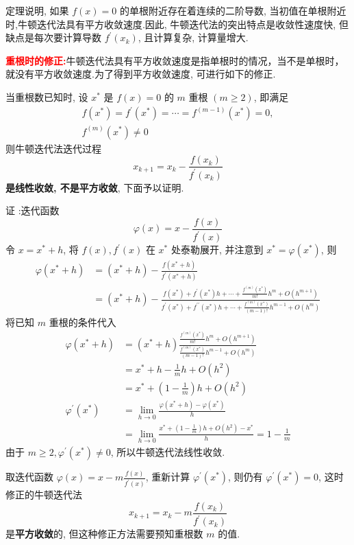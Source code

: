 定理说明, 如果 $ f(x)=0 $ 的单根附近存在着连续的二阶导数, 当初值在单根附近时,牛顿迭代法具有平方收敛速度.因此, 牛顿迭代法的突出特点是收敛性速度快, 但缺点是每次要计算导数 $ f^{\prime}\left(x_{k}\right) $, 且计算复杂, 计算量增大.

 \textbf{\textcolor{red}{重根时的修正:}}牛顿迭代法具有平方收敛速度是指单根时的情况，当不是单根时，就没有平方收敛速度.为了得到平方收敛速度, 可进行如下的修正.

当重根数已知时, 设 $ x^{*} $ 是 $ f(x)=0 $ 的 $ m $ 重根 $ (m \geqslant 2) $, 即满足
$$
\begin{array}{c}
f\left(x^{*}\right)=f^{\prime}\left(x^{*}\right)=\cdots=f^{(m-1)}\left(x^{*}\right)=0, \\
f^{(m)}\left(x^{*}\right) \neq 0
\end{array}
$$
则牛顿迭代法迭代过程
$$\boxed{
x_{k+1}=x_{k}-\frac{f\left(x_{k}\right)}{f^{\prime}\left(x_{k}\right)}}
$$
\textbf{是线性收敛, 不是平方收敛}, 下面予以证明.

证 :迭代函数
$$
\varphi(x)=x-\frac{f(x)}{f^{\prime}(x)}
$$
令 $ x=x^{*}+h $, 将 $ f(x), f^{\prime}(x) $ 在 $ x^{*} $ 处泰勒展开, 并注意到 $ x^{*}=\varphi\left(x^{*}\right) $, 则
$$
\begin{aligned}
\varphi\left(x^{*}+h\right) & =\left(x^{*}+h\right)-\frac{f\left(x^{*}+h\right)}{f^{\prime}\left(x^{*}+h\right)} \\
& =\left(x^{*}+h\right)-\frac{f\left(x^{*}\right)+f^{\prime}\left(x^{*}\right) h+\cdots+\frac{f^{(m)}\left(x^{*}\right)}{m!} h^{m}+O\left(h^{m+1}\right)}{f^{\prime}\left(x^{*}\right)+f^{\prime \prime}\left(x^{*}\right) h+\cdots+\frac{f^{(m)}\left(x^{*}\right)}{(m-1)!} h^{m-1}+O\left(h^{m}\right)}
\end{aligned}
$$
将已知 $ m $ 重根的条件代入
$$
\begin{aligned}
\varphi\left(x^{*}+h\right) & =\left(x^{*}+h\right) \frac{\frac{f^{(m)}\left(x^{*}\right)}{m!} h^{m}+O\left(h^{m+1}\right)}{\frac{f^{(m)}\left(x^{*}\right)}{(m-1)!} h^{m-1}+O\left(h^{m}\right)} \\
& =x^{*}+h-\frac{1}{m} h+O\left(h^{2}\right) \\
& =x^{*}+\left(1-\frac{1}{m}\right) h+O\left(h^{2}\right) \\
\varphi^{\prime}\left(x^{*}\right) & =\lim _{h \rightarrow 0} \frac{\varphi\left(x^{*}+h\right)-\varphi\left(x^{*}\right)}{h} \\
& =\lim _{h \rightarrow 0} \frac{x^{*}+\left(1-\frac{1}{m}\right) h+O\left(h^{2}\right)-x^{*}}{h}=1-\frac{1}{m}
\end{aligned}
$$
由于 $ m \geqslant 2, \varphi^{\prime}\left(x^{*}\right) \neq 0 $, 所以牛顿迭代法线性收敛.

取迭代函数 $ \varphi(x)=x-m \frac{f(x)}{f^{\prime}(x)} $, 重新计算 $ \varphi^{\prime}\left(x^{*}\right) $, 则仍有 $ \varphi^{\prime}\left(x^{*}\right)=0 $, 这时修正的牛顿迭代法
$$\boxed{
x_{k+1}=x_{k}-m \frac{f\left(x_{k}\right)}{f^{\prime}\left(x_{k}\right)}}
$$
是\textbf{平方收敛}的, 但这种修正方法需要预知重根数 $ m $ 的值.